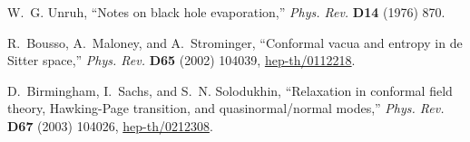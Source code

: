 \documentclass[12pt]{article}
\begin{document}
\begin{thebibliography}{10}
W.~G. Unruh, ``Notes on black hole evaporation,'' {\em Phys. Rev.} {\bf D14}
  (1976)
870.

R.~Bousso, A.~Maloney, and A.~Strominger, ``Conformal vacua and entropy in de
  Sitter space,'' {\em Phys. Rev.} {\bf D65} (2002) 104039,
\href{http://www.arXiv.org/abs/hep-th/0112218}{ hep-th/0112218}.

D.~Birmingham, I.~Sachs, and S.~N. Solodukhin, ``Relaxation in conformal field
  theory, Hawking-Page transition, and quasinormal/normal modes,'' {\em Phys.
  Rev.} {\bf D67} (2003) 104026,
\href{http://www.arXiv.org/abs/hep-th/0212308}{ hep-th/0212308}.

\end{thebibliography}
\endgroup
\end{document}
